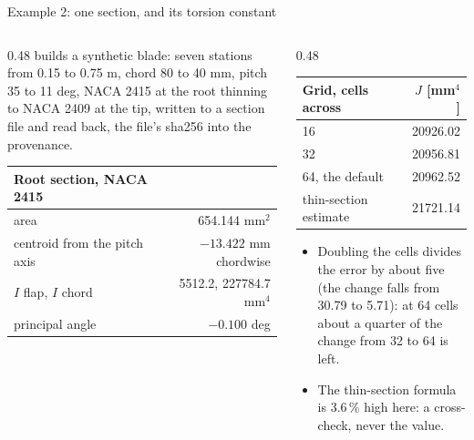\begin{frame}{Example 2: one section, and its torsion constant}
\begin{columns}[T]
\begin{column}{0.48\textwidth}
 builds a synthetic blade:
seven stations from 0.15 to 0.75 m, chord 80 to 40 mm, pitch 35 to 11 deg,
NACA 2415 at the root thinning to NACA 2409 at the tip, written to a section
file and read back, the file's sha256 into the provenance.
\par\vspace{2mm}
{\tiny\renewcommand{\arraystretch}{1.15}
\begin{tabular}{@{}lr@{}}
\toprule
\textbf{Root section, NACA 2415} & \\
\midrule
area & 654.144 mm\(^2\) \\
centroid from the pitch axis & \(-13.422\) mm chordwise \\
\(I\) flap, \(I\) chord & 5512.2, 227784.7 mm\(^4\) \\
principal angle & \(-0.100\) deg \\
\bottomrule
\end{tabular}}
\end{column}
\begin{column}{0.48\textwidth}
{\ftstablesize\renewcommand{\arraystretch}{1.15}
\begin{tabular}{@{}lr@{}}
\toprule
\textbf{Grid, cells across} & \(J\) [mm\(^4\)] \\
\midrule
16 & 20926.02 \\
32 & 20956.81 \\
64, the default & 20962.52 \\
thin-section estimate & 21721.14 \\
\bottomrule
\end{tabular}}
\par\vspace{1.5mm}
\begin{itemize}\scriptsize
  \item Doubling the cells divides the error by about five (the change falls
        from 30.79 to 5.71): at 64 cells about a quarter of the change from
        32 to 64 is left.
  \item The thin-section formula is 3.6\,\% high here: a cross-check, never
        the value.
\end{itemize}
\end{column}
\end{columns}
\end{frame}

